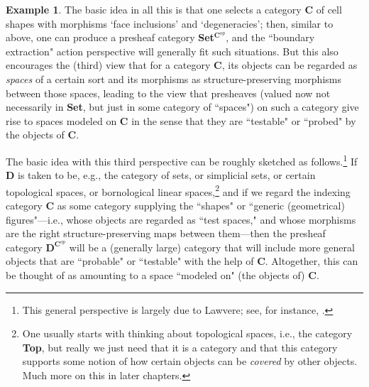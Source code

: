 \documentclass[a4paper]{book}
\theoremstyle{definition}
\newtheorem{example}{Example}[section]
\theoremstyle{definition}
\theoremstyle{definition}
\theoremstyle{theorem}
\theoremstyle{definition}
\begin{document}
\begin{example}
	The basic idea in all this is that one selects a category $\textbf{C}$ of cell shapes with morphisms `face inclusions' and `degeneracies'; then, similar to above, one can produce a presheaf category \textbf{Set}$^{\textbf{C}^{op}}$, and the ``boundary extraction" action perspective will generally fit such situations. But this also encourages the (third) view that for a category $\textbf{C}$, its objects can be regarded as \textit{spaces} of a certain sort and its morphisms as structure-preserving morphisms between those spaces, leading to the view that presheaves (valued now not necessarily in \textbf{Set}, but just in some category of ``spaces") on such a category give rise to spaces modeled on \textbf{C} in the sense that they are ``testable" or ``probed" by the objects of \textbf{C}. \par 
	The basic idea with this third perspective can be roughly sketched as follows.\footnote{This general perspective is largely due to Lawvere; see, for instance, \cite{lawvere_taking_2005}.} If \textbf{D} is taken to be, e.g., the category of sets, or simplicial sets, or certain topological spaces, or bornological linear spaces,\footnote{One usually starts with thinking about topological spaces, i.e., the category \textbf{Top}, but really we just need that it is a category and that this category supports some notion of how certain objects can be \textit{covered} by other objects. Much more on this in later chapters.} and if we regard the indexing category $\textbf{C}$ as some category supplying the ``shapes" or ``generic (geometrical) figures"---i.e., whose objects are regarded as ``test spaces," and whose morphisms are the right structure-preserving maps between them---then the presheaf category $\textbf{D}^{\textbf{C}^{op}}$ will be a (generally large) category that will include more general objects that are ``probable" or ``testable" with the help of $\textbf{C}$. Altogether, this can be thought of as amounting to a space ``modeled on" (the objects of) \textbf{C}. \par 

\end{example}
\end{document}
